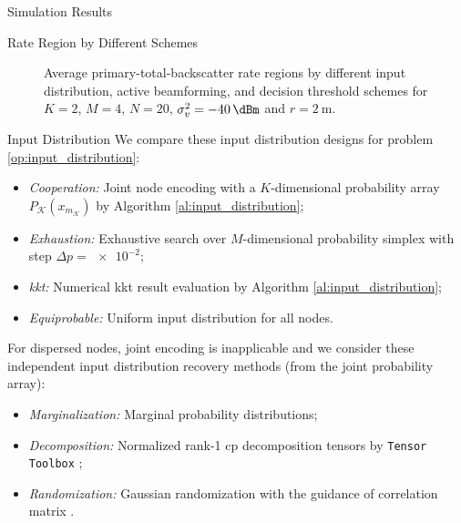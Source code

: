 \documentclass[journal,12pt,onecolumn,draftclsnofoot]{IEEEtran}
\theoremstyle{remark}
\begin{document}
\begin{section}{Simulation Results}
	\begin{subsection}{Rate Region by Different Schemes}
		\begin{figure}[!t]
			\centering
			\subfloat[Input Distribution, $Q=1$\label{fg:region_distribution}]{
				\resizebox{0.27\columnwidth}{!}{
					
				}
			}
			\subfloat[Active Beamforming, $Q=4$\label{fg:region_beamforming}]{
				\resizebox{0.27\columnwidth}{!}{
					
				}
			}
			\subfloat[Decision Threshold, $Q=4$\label{fg:region_threshold}]{
				\resizebox{0.27\columnwidth}{!}{
					
				}
			}
			\caption{
				Average primary-total-backscatter rate regions by different input distribution, active beamforming, and decision threshold schemes for $K=2$, $M=4$, $N=20$, $\sigma_v^2=\qty{-40}{\dBm}$ and $r=\qty{2}{\meter}$.
			}
		\end{figure}
		\begin{subsubsection}{Input Distribution}
			We compare these input distribution designs for problem \eqref{op:input_distribution}:
			\begin{itemize}
				\item \emph{Cooperation:} Joint node encoding with a $K$-dimensional probability array $P_{\mathcal{K}}(x_{m_{\mathcal{K}}})$ by Algorithm \ref{al:input_distribution};
				\item \emph{Exhaustion:} Exhaustive search over $M$-dimensional probability simplex with step $\Delta p = \num{e-2}$;
				\item \emph{\gls{kkt}:} Numerical \gls{kkt} result evaluation by Algorithm \ref{al:input_distribution};
				\item \emph{Equiprobable:} Uniform input distribution for all nodes.
			\end{itemize}
			For dispersed nodes, joint encoding is inapplicable and we consider these independent input distribution recovery methods (from the joint probability array):
			\begin{itemize}
				\item \emph{Marginalization:} Marginal probability distributions;
				\item \emph{Decomposition:} Normalized rank-\num{1} \gls{cp} decomposition tensors by \texttt{Tensor Toolbox} \cite{Bader2022};
				\item \emph{Randomization:} Gaussian randomization with the guidance of correlation matrix \cite{Calvo2010}.
			\end{itemize}


\end{subsubsection}
\end{subsection}
\end{section}
\end{document}
